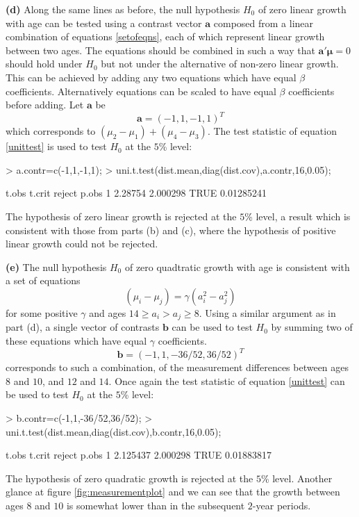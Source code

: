 \documentclass[a4paper,11pt]{article}
\begin{document}
{\bf (d)} Along the same lines as before, the null hypothesis $H_0$ of zero linear growth with age can be tested using a contrast vector $\mathbf{a}$ composed from a linear combination of equations \ref{setofeqns}, each of which represent linear growth between two ages. The equations should be combined in such a way that $\mathbf{a'}\bm{\mu}=0$ should hold under $H_0$ but not under the alternative of non-zero linear growth. This can be achieved by adding any two equations which have equal $\beta$ coefficients. Alternatively equations can be scaled to have equal $\beta$ coefficients before adding.
Let $\mathbf{a}$ be
\begin{equation*}
\mathbf{a} = (-1,1,-1,1)^T
\end{equation*}
which corresponds to $(\mu_2-\mu_1)+(\mu_4-\mu_3)$. The test statistic of equation \ref{unittest} is used to test $H_0$ at the $5$\% level:
\begin{Schunk}
\begin{Sinput}
> a.contr=c(-1,1,-1,1);
> uni.t.test(dist.mean,diag(dist.cov),a.contr,16,0.05);
\end{Sinput}
\begin{Soutput}
    t.obs   t.crit reject      p.obs
1 2.28754 2.000298   TRUE 0.01285241
\end{Soutput}
\end{Schunk}
The hypothesis of zero linear growth is rejected at the $5$\% level, a result which is consistent with those from parts (b) and (c), where the hypothesis of positive linear growth could not be rejected.

{\bf (e)} The null hypothesis $H_0$ of zero quadtratic growth with age is consistent with a set of equations
\begin{equation}
(\mu_i-\mu_j) = \gamma(a_i^2-a_j^2)
\end{equation}
for some positive $\gamma$ and ages $14\ge a_i > a_j \ge 8$. Using a similar argument as in part (d), a single vector of contrasts $\mathbf{b}$ can be used to test $H_0$ by summing two of these equations which have equal $\gamma$ coefficients.
\begin{equation*}
\mathbf{b}=(-1,1,-36/52,36/52)^T
\end{equation*}
corresponds to such a combination, of the measurement differences between ages $8$ and $10$, and $12$ and $14$. Once again the test statistic of equation \ref{unittest} can be used to test $H_0$ at the $5$\% level:
\begin{Schunk}
\begin{Sinput}
> b.contr=c(-1,1,-36/52,36/52);
> uni.t.test(dist.mean,diag(dist.cov),b.contr,16,0.05);
\end{Sinput}
\begin{Soutput}
     t.obs   t.crit reject      p.obs
1 2.125437 2.000298   TRUE 0.01883817
\end{Soutput}
\end{Schunk}
The hypothesis of zero quadratic growth is rejected at the $5$\% level. Another glance at figure \ref{fig:measurementplot} and we can see that the growth between ages $8$ and $10$ is somewhat lower than in the subsequent $2$-year periods.
\end{document}
